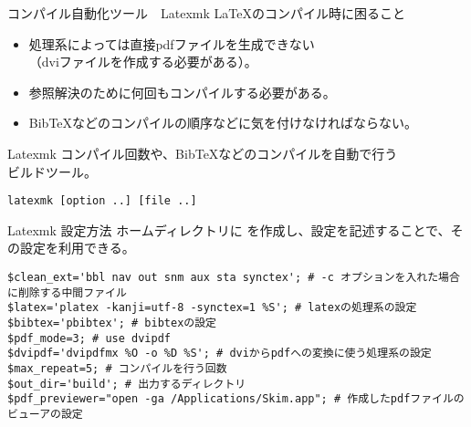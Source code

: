 \documentclass[dvipdfmx,12pt,beamer]{standalone}
\begin{document}
\begin{frame}[fragile]{コンパイル自動化ツール　Latexmk}
	\LaTeX のコンパイル時に困ること
	\begin{itemize}
		\item 処理系によっては直接pdfファイルを生成できない\\（dviファイルを作成する必要がある）。
		\item 参照解決のために何回もコンパイルする必要がある。
		\item Bib\TeX などのコンパイルの順序などに気を付けなければならない。
	\end{itemize}

	\begin{block}{Latexmk}
		コンパイル回数や、Bib\TeX などのコンパイルを自動で行う\\ビルドツール。
		\begin{lstlisting}
latexmk [option ..] [file ..]
\end{lstlisting}
	\end{block}
\end{frame}

\begin{frame}[fragile]{Latexmk 設定方法}
	ホームディレクトリに を作成し、設定を記述することで、その設定を利用できる。
\begin{lstlisting}[frame=single, caption=.latexmkrc 設定例, basicstyle={\ttfamily\tiny}]
$clean_ext='bbl nav out snm aux sta synctex'; # -c オプションを入れた場合に削除する中間ファイル
$latex='platex -kanji=utf-8 -synctex=1 %S'; # latexの処理系の設定
$bibtex='pbibtex'; # bibtexの設定
$pdf_mode=3; # use dvipdf
$dvipdf='dvipdfmx %O -o %D %S'; # dviからpdfへの変換に使う処理系の設定
$max_repeat=5; # コンパイルを行う回数
$out_dir='build'; # 出力するディレクトリ
$pdf_previewer="open -ga /Applications/Skim.app"; # 作成したpdfファイルのビューアの設定
\end{lstlisting}

\end{frame}
\end{document}
